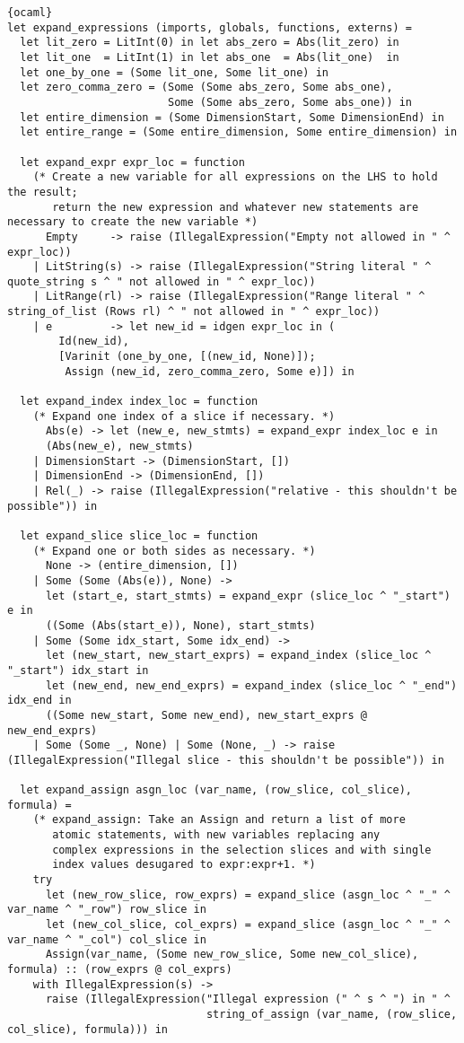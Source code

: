 \begin{lstlisting}{ocaml}
let expand_expressions (imports, globals, functions, externs) =
  let lit_zero = LitInt(0) in let abs_zero = Abs(lit_zero) in
  let lit_one  = LitInt(1) in let abs_one  = Abs(lit_one)  in
  let one_by_one = (Some lit_one, Some lit_one) in
  let zero_comma_zero = (Some (Some abs_zero, Some abs_one),
                         Some (Some abs_zero, Some abs_one)) in
  let entire_dimension = (Some DimensionStart, Some DimensionEnd) in
  let entire_range = (Some entire_dimension, Some entire_dimension) in

  let expand_expr expr_loc = function
    (* Create a new variable for all expressions on the LHS to hold the result;
       return the new expression and whatever new statements are necessary to create the new variable *)
      Empty     -> raise (IllegalExpression("Empty not allowed in " ^ expr_loc))
    | LitString(s) -> raise (IllegalExpression("String literal " ^ quote_string s ^ " not allowed in " ^ expr_loc))
    | LitRange(rl) -> raise (IllegalExpression("Range literal " ^ string_of_list (Rows rl) ^ " not allowed in " ^ expr_loc))
    | e         -> let new_id = idgen expr_loc in (
        Id(new_id),
        [Varinit (one_by_one, [(new_id, None)]);
         Assign (new_id, zero_comma_zero, Some e)]) in

  let expand_index index_loc = function
    (* Expand one index of a slice if necessary. *)
      Abs(e) -> let (new_e, new_stmts) = expand_expr index_loc e in
      (Abs(new_e), new_stmts)
    | DimensionStart -> (DimensionStart, [])
    | DimensionEnd -> (DimensionEnd, [])
    | Rel(_) -> raise (IllegalExpression("relative - this shouldn't be possible")) in

  let expand_slice slice_loc = function
    (* Expand one or both sides as necessary. *)
      None -> (entire_dimension, [])
    | Some (Some (Abs(e)), None) ->
      let (start_e, start_stmts) = expand_expr (slice_loc ^ "_start") e in
      ((Some (Abs(start_e)), None), start_stmts)
    | Some (Some idx_start, Some idx_end) ->
      let (new_start, new_start_exprs) = expand_index (slice_loc ^ "_start") idx_start in
      let (new_end, new_end_exprs) = expand_index (slice_loc ^ "_end") idx_end in
      ((Some new_start, Some new_end), new_start_exprs @ new_end_exprs)
    | Some (Some _, None) | Some (None, _) -> raise (IllegalExpression("Illegal slice - this shouldn't be possible")) in

  let expand_assign asgn_loc (var_name, (row_slice, col_slice), formula) =
    (* expand_assign: Take an Assign and return a list of more
       atomic statements, with new variables replacing any
       complex expressions in the selection slices and with single
       index values desugared to expr:expr+1. *)
    try
      let (new_row_slice, row_exprs) = expand_slice (asgn_loc ^ "_" ^ var_name ^ "_row") row_slice in
      let (new_col_slice, col_exprs) = expand_slice (asgn_loc ^ "_" ^ var_name ^ "_col") col_slice in
      Assign(var_name, (Some new_row_slice, Some new_col_slice), formula) :: (row_exprs @ col_exprs)
    with IllegalExpression(s) ->
      raise (IllegalExpression("Illegal expression (" ^ s ^ ") in " ^
                               string_of_assign (var_name, (row_slice, col_slice), formula))) in


\end{lstlisting}
